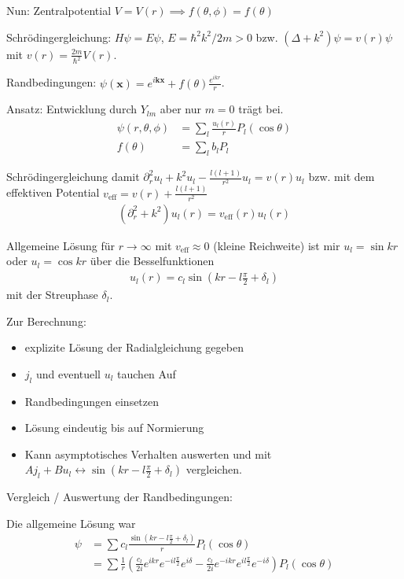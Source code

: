 \documentclass[11pt,a4paper]{report}
\begin{document}
Nun: Zentralpotential $V = V(r) \implies f(\theta, \phi) = f(\theta)$

Schrödingergleichung: $H \psi = E \psi$, $E = \hbar^2 k^2 / 2 m > 0$ bzw. $(\Delta + k^2) \psi = v(r) \psi$ mit $v(r) = \frac{2m}{\hbar^2} V(r)$.

Randbedingungen: $\psi(\mathbf{x}) = e^{i \mathbf{k} \mathbf{x}} + f(\theta) \frac{e^{i k r}}{r}$.

Ansatz: Entwicklung durch $Y_{l m}$ aber nur $m=0$ trägt bei.
\begin{align*}
    \psi(r, \theta, \phi) &= \sum_l \frac{u_l(r)}{r} P_l(\cos \theta) \\
    f(\theta) &= \sum_l b_l P_l
\end{align*}

Schrödingergleichung damit $\partial_r^2 u_l + k^2 u_l - \frac{l (l+1)}{r^2} u_l = v(r) u_l$ bzw. mit dem effektiven Potential $v_{\mathrm{eff}} = v(r) + \frac{l (l+1)}{r^2}$ 
\begin{align*}
    (\partial_r^2 + k^2) u_l (r) = v_{\mathrm{eff}}(r) u_l(r)
\end{align*}

Allgemeine Lösung für $r \rightarrow \infty$ mit $v_{\mathrm{eff}} \approx 0$ (kleine Reichweite) ist mir $u_l = \sin kr$ oder $u_l = \cos k r$ über die Besselfunktionen
\begin{align*}
    u_l(r) = c_l \sin \left(k r - l \frac{\pi}{2} + \delta_l \right)
\end{align*}
mit der Streuphase $\delta_l$.

Zur Berechnung:
\begin{itemize}
    \item explizite Lösung der Radialgleichung gegeben
    \item $j_l$ und eventuell $u_l$ tauchen Auf
    \item Randbedingungen einsetzen
    \item Lösung eindeutig bis auf Normierung
    \item Kann asymptotisches Verhalten auswerten und mit $A j_l + B u_l \leftrightarrow \sin \left( k r - l \frac{\pi}{2} + \delta_l\right)$ vergleichen.
\end{itemize}

Vergleich / Auswertung der Randbedingungen:

Die allgemeine Lösung war
\begin{align*}
    \psi &= \sum c_l \frac{\sin \left(k r - l \frac{\pi}{2} + \delta_l \right)}{r} P_l(\cos \theta) \\
    &= \sum \frac{1}{r} \left(\frac{c_l}{2 i} e^{i k r} e^{-i l \frac{\pi}{2}} e^{i \delta} - \frac{c_l}{2 i} e^{-i k r} e^{i l \frac{\pi}{2}} e^{-i \delta}\right) P_l (\cos \theta)     
\end{align*}
\end{document}
